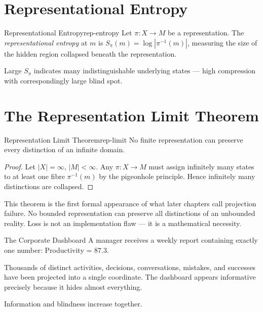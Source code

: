 \documentclass[12pt,twoside,openright]{book}
\begin{document}
\section{Representational Entropy}
\label{sec:ch2-rep}

\begin{definition}{Representational Entropy}{rep-entropy}
  Let $\pi: X \to M$ be a representation. The
  \emph{representational entropy} at $m$ is
  $S_\pi(m) = \log|\pi^{-1}(m)|$,
  measuring the size of the hidden region collapsed
  beneath the representation.
\end{definition}

Large $S_\pi$ indicates many indistinguishable underlying
states — high compression with correspondingly large
blind spot.

\section{The Representation Limit Theorem}
\label{sec:ch2-limit}

\begin{theorem}{Representation Limit Theorem}{rep-limit}
  No finite representation can preserve every distinction
  of an infinite domain.
\end{theorem}

\begin{proof}
  Let $|X| = \infty$, $|M| < \infty$. Any $\pi: X \to M$
  must assign infinitely many states to at least one
  fibre $\pi^{-1}(m)$ by the pigeonhole principle.
  Hence infinitely many distinctions are collapsed.
\end{proof}

This theorem is the first formal appearance of what
later chapters call projection failure. No bounded
representation can preserve all distinctions of an
unbounded reality. Loss is not an implementation flaw
— it is a mathematical necessity.

\begin{distinctionaside}{The Corporate Dashboard}
A manager receives a weekly report containing exactly one
number: Productivity = 87.3.

Thousands of distinct activities, decisions, conversations,
mistakes, and successes have been projected into a single
coordinate. The dashboard appears informative precisely
because it hides almost everything.

Information and blindness increase together.
\end{distinctionaside}
\end{document}
